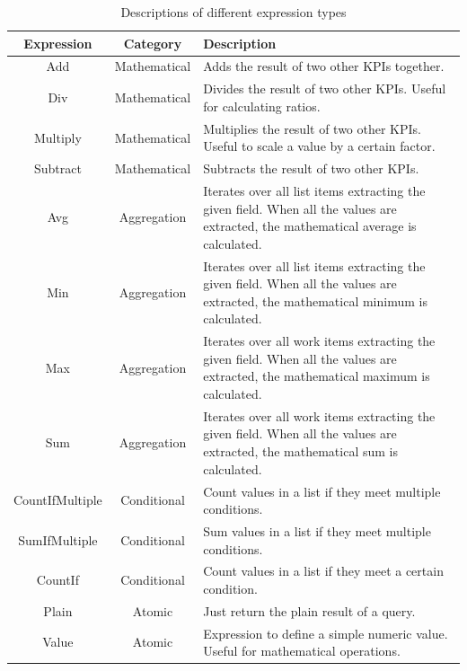 \begin{table}[!h]
    \centering
    \begin{tabular}{c c p{8cm}}
    \hline
    \textbf{Expression} & \textbf{Category} & \textbf{Description} \\
    \hline
    Add & Mathematical & Adds the result of two other KPIs together. \\
    \hline
    Div & Mathematical & Divides the result of two other KPIs. Useful for calculating ratios. \\
    \hline
    Multiply & Mathematical & Multiplies the result of two other KPIs. Useful to scale a value by a certain factor. \\
    \hline
    Subtract & Mathematical & Subtracts the result of two other KPIs. \\
    \hline
    Avg & Aggregation & Iterates over all list items extracting the given field. When all the values are extracted, the mathematical average is calculated. \\
    \hline
    Min & Aggregation & Iterates over all list items extracting the given field. When all the values are extracted, the mathematical minimum is calculated. \\
    \hline
    Max & Aggregation & Iterates over all work items extracting the given field. When all the values are extracted, the mathematical maximum is calculated. \\
    \hline
    Sum & Aggregation & Iterates over all work items extracting the given field. When all the values are extracted, the mathematical sum is calculated. \\
    \hline
    CountIfMultiple & Conditional & Count values in a list if they meet multiple conditions. \\
    \hline
    SumIfMultiple & Conditional & Sum values in a list if they meet multiple conditions. \\
    \hline
    CountIf & Conditional & Count values in a list if they meet a certain condition. \\
    \hline
    Plain & Atomic & Just return the plain result of a query. \\
    \hline
    Value & Atomic & Expression to define a simple numeric value. Useful for mathematical operations. \\
    \end{tabular}
    \caption{Descriptions of different expression types}
    \label{tab:expression-types}
\end{table}

